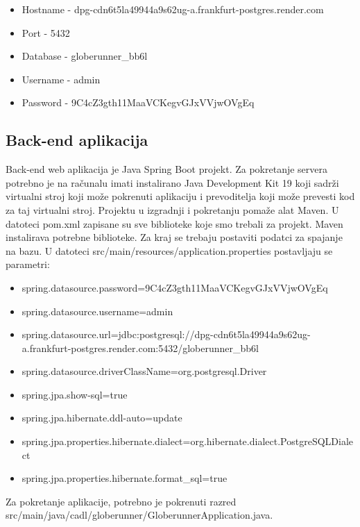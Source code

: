 			\begin{itemize}
				\item Hostname - dpg-cdn6t5la49944a9s62ug-a.frankfurt-postgres.render.com
				\item Port - 5432
				\item Database - globerunner\_bb6l
				\item Username - admin
				\item Password - 9C4cZ3gth11MaaVCKegvGJxVVjwOVgEq
			\end{itemize}

			\bigskip

			\subsection{Back-end aplikacija}

			Back-end web aplikacija je Java Spring Boot projekt. Za pokretanje servera potrebno je na računalu imati instalirano Java Development Kit 19 koji sadrži virtualni stroj koji može pokrenuti aplikaciju i prevoditelja koji može prevesti kod za taj virtualni stroj. Projektu u izgradnji i pokretanju pomaže alat Maven. U datoteci pom.xml zapisane su sve biblioteke koje smo trebali za projekt. Maven instalirava potrebne biblioteke. Za kraj se trebaju postaviti podatci za spajanje na bazu. U datoteci src/main/resources/application.properties postavljaju se parametri:

			\begin{itemize}
				\item spring.datasource.password=9C4cZ3gth11MaaVCKegvGJxVVjwOVgEq
				\item spring.datasource.username=admin
				\item spring.datasource.url=jdbc:postgresql://dpg-cdn6t5la49944a9s62ug-a.frankfurt-postgres.render.com:5432/globerunner\_bb6l
				\item spring.datasource.driverClassName=org.postgresql.Driver

				\item spring.jpa.show-sql=true
				\item spring.jpa.hibernate.ddl-auto=update
				\item spring.jpa.properties.hibernate.dialect=org.hibernate.dialect.PostgreSQLDialect
				\item spring.jpa.properties.hibernate.format\_sql=true
			\end{itemize}

			Za pokretanje aplikacije, potrebno je pokrenuti razred \\ src/main/java/cadl/globerunner/GloberunnerApplication.java.

